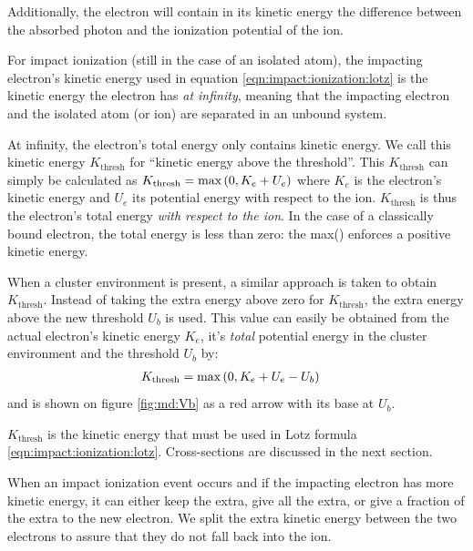 Additionally, the electron will contain in its kinetic energy the difference
between the absorbed photon and the ionization potential of the ion.



For impact ionization (still in the case of an isolated atom),
the impacting electron's kinetic energy used in equation
\eqref{eqn:impact:ionization:lotz} is the kinetic energy the electron has
\textit{at infinity}, meaning that the impacting electron and the isolated
atom (or ion) are separated in an unbound system.

At infinity, the electron's total energy only contains kinetic
energy. We call this kinetic energy $K_{\textrm{thresh}}$ for ``kinetic energy
above the threshold''. This $K_{\textrm{thresh}}$ can simply be calculated
as $K_{\textrm{thresh}} = \textrm{max}\left( 0, K_e + U_e \right)$
where $K_e$ is the
electron's kinetic energy and $U_e$ its potential energy with respect to the ion.
$K_{\textrm{thresh}}$ is thus the electron's total energy \textit{with respect
to the ion}.
In the case of a classically bound electron, the total energy is less than zero:
the max() enforces a positive kinetic energy.

When a cluster environment is present, a similar approach is taken to obtain
$K_{\textrm{thresh}}$. Instead of taking the extra energy above zero for
$K_{\textrm{thresh}}$, the extra energy above the new threshold $U_b$ is used.
This value can easily be obtained from the actual electron's kinetic energy
$K_e$, it's \textit{total} potential energy in the cluster environment and the
threshold $U_b$ by:
\begin{align}
K_{\textrm{thresh}} & = \textrm{max}\left( 0, K_e + U_e - U_b \right)
\label{eqn:md:kthresh}
\end{align}
and is shown on figure \ref{fig:md:Vb} as a red arrow with its base at $U_b$.


$K_{\textrm{thresh}}$ is the kinetic energy that must be used in Lotz formula
\eqref{eqn:impact:ionization:lotz}. Cross-sections are discussed in the next
section.


When an impact ionization event occurs and if the impacting electron has more kinetic
energy, it can either keep the extra, give all the extra, or give a fraction of
the extra to the new electron. We split the extra kinetic energy between the two
electrons to assure that they do not fall back into the ion.


